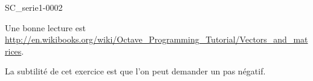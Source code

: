 \begin{corrige}{SC_serie1-0002}

 
	Une bonne lecture est\\ \url{http://en.wikibooks.org/wiki/Octave_Programming_Tutorial/Vectors_and_matrices}.
	


La subtilité de cet exercice est que l'on peut demander un pas négatif.

\end{corrige}

